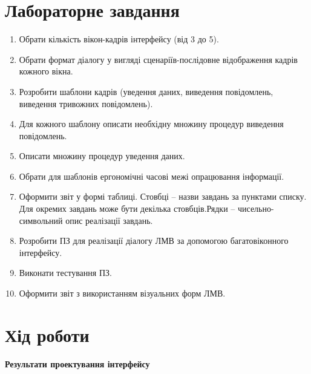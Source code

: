\documentclass[14pt]{extreport}
\begin{document}
\begin{normalsize}
  \section*{Лабораторне завдання}
  \begin{enumerate}
  	\item Обрати кількість вікон-кадрів інтерфейсу (від 3 до 5).
  \item Обрати формат діалогу у вигляді сценаріїв-послідовне відображення кадрів кожного вікна.
  \item Розробити шаблони кадрів (уведення даних, виведення повідомлень, виведення тривожних повідомлень).
  \item Для кожного шаблону описати необхідну множину процедур виведення повідомлень.
  \item Описати множину процедур уведення даних.
  \item Обрати для шаблонів ергономічні часові межі опрацювання інформації.
  \item Оформити звіт у формі таблиці. Стовбці – назви завдань за пунктами списку. Для окремих завдань може бути декілька стовбців.Рядки – чисельно-символьний опис реалізації завдань.
  \item Розробити ПЗ для реалізації діалогу ЛМВ за допомогою багатовіконного інтерфейсу.
  \item Виконати тестування ПЗ.
  \item Оформити звіт з використанням візуальних форм ЛМВ.
  \end{enumerate}
  
  \section*{Хід роботи}
  
  \begin{table}[H]
  \centering
  \renewcommand{\tablename}{Таблиця}
  \renewcommand{\thetable}{\arabic{table}}
  \captionsetup{justification=raggedleft, singlelinecheck=false, labelsep=period}
  \caption{}
  \textbf{Результати проектування інтерфейсу\vspace{5pt}}
  \end{table}
	

\end{normalsize}
\end{document}
